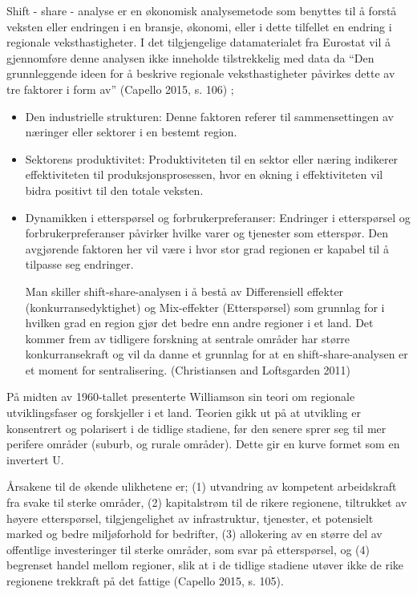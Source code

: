 \documentclass[
  letterpaper,
  DIV=11,
  numbers=noendperiod]{scrartcl}
\begin{document}
Shift - share - analyse er en økonomisk analysemetode som benyttes til å
forstå veksten eller endringen i en bransje, økonomi, eller i dette
tilfellet en endring i regionale veksthastigheter. I det tilgjengelige
datamaterialet fra Eurostat vil å gjennomføre denne analysen ikke
inneholde tilstrekkelig med data da ``Den grunnleggende ideen for å
beskrive regionale veksthastigheter påvirkes dette av tre faktorer i
form av'' (Capello 2015, s. 106) ;

\begin{itemize}
\item
  Den industrielle strukturen: Denne faktoren referer til
  sammensettingen av næringer eller sektorer i en bestemt region.
\item
  Sektorens produktivitet: Produktiviteten til en sektor eller næring
  indikerer effektiviteten til produksjonsprosessen, hvor en økning i
  effektiviteten vil bidra positivt til den totale veksten.
\item
  Dynamikken i etterspørsel og forbrukerpreferanser: Endringer i
  etterspørsel og forbrukerpreferanser påvirker hvilke varer og
  tjenester som etterspør. Den avgjørende faktoren her vil være i hvor
  stor grad regionen er kapabel til å tilpasse seg endringer.

  Man skiller shift-share-analysen i å bestå av Differensiell effekter
  (konkurransedyktighet) og Mix-effekter (Etterspørsel) som grunnlag for
  i hvilken grad en region gjør det bedre enn andre regioner i et land.
  Det kommer frem av tidligere forskning at sentrale områder har større
  konkurransekraft og vil da danne et grunnlag for at en
  shift-share-analysen er et moment for sentralisering. (Christiansen
  and Loftsgarden 2011)
\end{itemize}

På midten av 1960-tallet presenterte Williamson sin teori om regionale
utviklingsfaser og forskjeller i et land. Teorien gikk ut på at
utvikling er konsentrert og polarisert i de tidlige stadiene, før den
senere sprer seg til mer perifere områder (suburb, og rurale områder).
Dette gir en kurve formet som en invertert U.

Årsakene til de økende ulikhetene er; (1) utvandring av kompetent
arbeidskraft fra svake til sterke områder, (2) kapitalstrøm til de
rikere regionene, tiltrukket av høyere etterspørsel, tilgjengelighet av
infrastruktur, tjenester, et potensielt marked og bedre miljøforhold for
bedrifter, (3) allokering av en større del av offentlige investeringer
til sterke områder, som svar på etterspørsel, og (4) begrenset handel
mellom regioner, slik at i de tidlige stadiene utøver ikke de rike
regionene trekkraft på det fattige (Capello 2015, s. 105).
\end{document}
